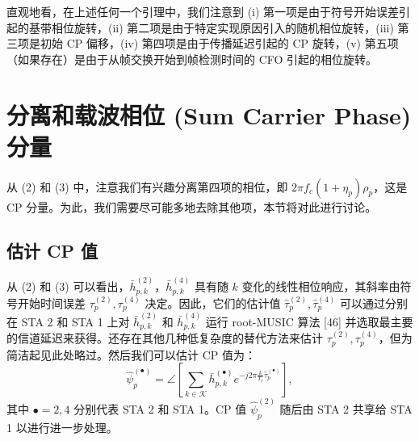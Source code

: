 \documentclass[journal]{IEEEtran}
\begin{document}
直观地看，在上述任何一个引理中，我们注意到 (i) 第一项是由于符号开始误差引起的基带相位旋转，(ii) 第二项是由于特定实现原因引入的随机相位旋转，(iii) 第三项是初始 CP 偏移，(iv) 第四项是由于传播延迟引起的 CP 旋转，(v) 第五项（如果存在）是由于从帧交换开始到帧检测时间的 CFO 引起的相位旋转。

\section{分离和载波相位 (Sum Carrier Phase) 分量}
从 (2) 和 (3) 中，注意我们有兴趣分离第四项的相位，即 $2\pi f_c (1+\eta_p)\rho_p$，这是 CP 分量。为此，我们需要尽可能多地去除其他项，本节将对此进行讨论。

\subsection{估计 CP 值}
从 (2) 和 (3) 可以看出，$\bar{h}_{p,k}^{(2)}$，$\bar{h}_{p,k}^{(4)}$ 具有随 $k$ 变化的线性相位响应，其斜率由符号开始时间误差 $\tau_p^{(2)}, \tau_p^{(4)}$ 决定。因此，它们的估计值 $\hat{\tau}_p^{(2)}, \hat{\tau}_p^{(4)}$ 可以通过分别在 STA 2 和 STA 1 上对 $\bar{h}_{p,k}^{(2)}$ 和 $\bar{h}_{p,k}^{(4)}$ 运行 root-MUSIC 算法 [46] 并选取最主要的信道延迟来获得。还存在其他几种低复杂度的替代方法来估计 $\tau_p^{(2)}, \tau_p^{(4)}$，但为简洁起见此处略过。然后我们可以估计 CP 值为：
\begin{equation}
\hat{\psi}_p^{(\bullet)} = \angle \left[ \sum_{k \in \mathcal{K}} \bar{h}_{p,k}^{(\bullet)} e^{-j2\pi \frac{k}{T_s} \hat{\tau}_p^{(\bullet)}} \right], \label{eq:4}
\end{equation}
其中 $\bullet = 2, 4$ 分别代表 STA 2 和 STA 1。CP 值 $\hat{\psi}_p^{(2)}$ 随后由 STA 2 共享给 STA 1 以进行进一步处理。
\end{document}
